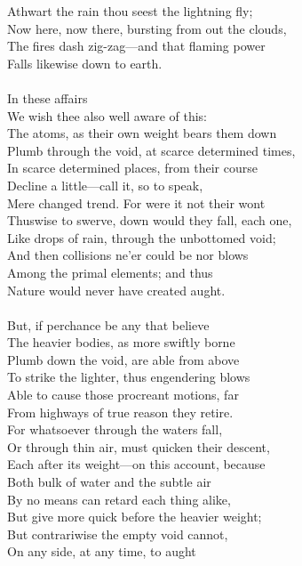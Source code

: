 Athwart the rain thou seest the lightning fly;\\
Now here, now there, bursting from out the clouds,\\
The fires dash zig-zag—and that flaming power\\
Falls likewise down to earth.\\
\\
In these affairs\\
We wish thee also well aware of this:\\
The atoms, as their own weight bears them down\\
Plumb through the void, at scarce determined times,\\
In scarce determined places, from their course\\
Decline a little—call it, so to speak,\\
Mere changed trend. For were it not their wont\\
Thuswise to swerve, down would they fall, each one,\\
Like drops of rain, through the unbottomed void;\\
And then collisions ne'er could be nor blows\\
Among the primal elements; and thus\\
Nature would never have created aught.\\
\\
But, if perchance be any that believe\\
The heavier bodies, as more swiftly borne\\
Plumb down the void, are able from above\\
To strike the lighter, thus engendering blows\\
Able to cause those procreant motions, far\\
From highways of true reason they retire.\\
For whatsoever through the waters fall,\\
Or through thin air, must quicken their descent,\\
Each after its weight—on this account, because\\
Both bulk of water and the subtle air\\
By no means can retard each thing alike,\\
But give more quick before the heavier weight;\\
But contrariwise the empty void cannot,\\
On any side, at any time, to aught\\
